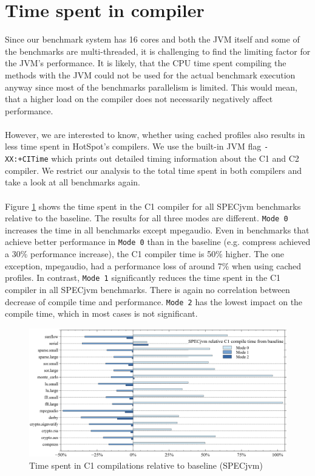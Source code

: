 \section{Time spent in compiler}
\label{s:perf_compiletime}
Since our benchmark system has 16 cores and both the JVM itself and some of the benchmarks are multi-threaded, it is challenging to find the limiting factor for the JVM's performance. It is likely, that the CPU time spent compiling the methods with the JVM could not be used for the actual benchmark execution anyway since most of the benchmarks parallelism is limited.
This would mean, that a higher load on the compiler does not necessarily negatively affect performance.
\\\\
However, we are interested to know, whether using cached profiles also results in less time spent in HotSpot's compilers.
We use the built-in JVM flag \texttt{-XX:+CITime} which prints out detailed timing information about the C1 and C2 compiler.
We restrict our analysis to the total time spent in both compilers and take a look at all benchmarks again.
\\\\
Figure \ref{f:all_variation_compiletime_c1} shows the time spent in the C1 compiler for all SPECjvm benchmarks relative to the baseline. The results for all three modes are different. \texttt{Mode 0} increases the time in all benchmarks except mpegaudio. Even in benchmarks that achieve better performance in \texttt{Mode 0} than in the baseline (e.g. compress achieved a 30\% performance increase), the C1 compiler time is 50\% higher. The one exception, mpegaudio, had a performance loss of around 7\% when using cached profiles.
In contrast, \texttt{Mode 1} significantly reduces the time spent in the C1 compiler in all SPECjvm benchmarks. There is again no correlation between decrease of compile time and performance.
\texttt{Mode 2} has the lowest impact on the compile time, which in most cases is not significant.
\begin{figure}[ht!]
  \begin{center}
    \centering
    \includegraphics[width=1.0\textwidth]{figures/all_variation_compiletime_c1.png}
    \caption{Time spent in C1 compilations relative to baseline (SPECjvm)}
    \label{f:all_variation_compiletime_c1}
  \end{center}
\end{figure}

